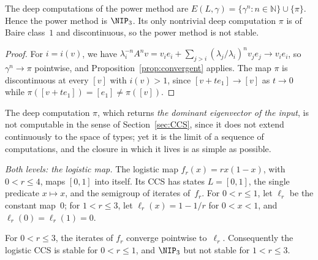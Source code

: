 \begin{prop}\label{prop:power}
The deep computations of the power method are
$E(L,\gamma)=\{\gamma^n:n\in\mathbb{N}\}\cup\{\pi\}$.
Hence the power method is $\NIP_3$.
Its only nontrivial deep computation $\pi$ is of Baire class~$1$ and
discontinuous, so the power method is not stable.
\end{prop}

\begin{proof}
For $i=i(v)$, we have $\lambda_i^{-n}A^nv=v_ie_i+\sum_{j>i}(\lambda_j/\lambda_i)^nv_je_j\to v_ie_i$,
so $\gamma^n\to\pi$ pointwise, and Proposition~\ref{prop:convergent} applies.
The map $\pi$ is discontinuous at every $[v]$ with $i(v)>1$, since $[v+te_1]\to[v]$ as $t\to0$
while $\pi([v+te_1])=[e_1]\ne\pi([v])$.
\end{proof}

The deep computation $\pi$, which returns \emph{the dominant eigenvector of the
input}, is not computable in the sense of Section~\ref{sec:CCS}, since it does not
extend continuously to the space of types; yet it is the limit of a sequence of
computations, and the closure in which it lives is as simple as possible.

\emph{Both levels: the logistic map.}
The logistic map $f_r(x)=rx(1-x)$, with $0<r\le4$, maps $[0,1]$ into itself.
Its CCS has states $L=[0,1]$, the single predicate $x\mapsto x$, and the
semigroup of iterates of~$f_r$.
For $0<r\le1$, let $\ell_r$ be the constant map~$0$; for $1<r\le3$, let
$\ell_r(x)=1-1/r$ for $0<x<1$, and $\ell_r(0)=\ell_r(1)=0$.

\begin{prop}\label{prop:logistic}
For $0<r\le3$, the iterates of $f_r$ converge pointwise to~$\ell_r$.
Consequently the logistic CCS is stable for $0<r\le1$, and $\NIP_3$ but not
stable for $1<r\le3$.
\end{prop}

